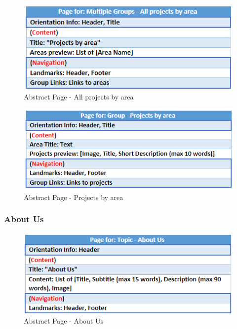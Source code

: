 \documentclass[11pt, letterpaper]{article}
\begin{document}
\begin{figure}[H]
    \centering
    \includegraphics[width=15cm]{images/Abstract Pages/AB - All projects by area.png}
    \caption{Abstract Page - All projects by area}
    \label{fig:AbstractPage_All_projects_by_area}
\end{figure}

\begin{figure}[H]
    \centering
    \includegraphics[width=15cm]{images/Abstract Pages/AB - Projects by area.png}
    \caption{Abstract Page - Projects by area}
    \label{fig:AbstractPage_Projects_by_area}
\end{figure}

\subsubsection{About Us}
\begin{figure}[H]
    \centering
    \includegraphics[width=15cm]{images/Abstract Pages/AB - About Us.png}
    \caption{Abstract Page - About Us}
    \label{fig:AbstractPage_About_Us}
\end{figure}
\end{document}
